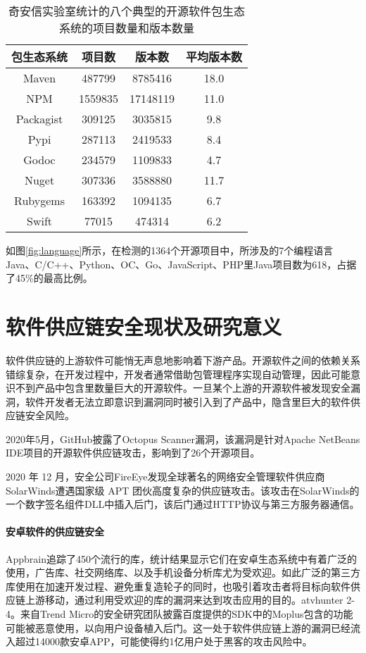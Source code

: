 \begin{table}[!hpt]
  \caption{奇安信实验室统计的八个典型的开源软件包生态系统的项目数量和版本数量}
  \label{tab:version}
  \centering
  \begin{tabular}{cccc} \toprule
    包生态系统 & 项目数 & 版本数 & 平均版本数 \\ \midrule
	Maven & 487799 & 8785416 & 18.0 \\
	NPM & 1559835 & 17148119 & 11.0 \\
	Packagist & 309125 & 3035815 & 9.8 \\
	Pypi & 287113 & 2419533 & 8.4 \\
	Godoc & 234579 & 1109833 & 4.7 \\
	Nuget & 307336 & 3588880 & 11.7 \\
	Rubygems & 163392 & 1094135 & 6.7 \\
	Swift & 77015 & 474314 & 6.2 \\ \bottomrule
  \end{tabular}
\end{table}

如图\ref{fig:language}所示，在检测的1364个开源项目中，所涉及的7个编程语言Java、C/C++、Python、OC、Go、JavaScript、PHP里Java项目数为618，占据了45\%的最高比例。




\section{软件供应链安全现状及研究意义}
软件供应链的上游软件可能悄无声息地影响着下游产品。开源软件之间的依赖关系错综复杂，在开发过程中，开发者通常借助包管理程序实现自动管理，因此可能意识不到产品中包含里数量巨大的开源软件。一旦某个上游的开源软件被发现安全漏洞，软件开发者无法立即意识到漏洞同时被引入到了产品中，隐含里巨大的软件供应链安全风险。

2020年5月，GitHub披露了Octopus Scanner漏洞\cite{octopus}，该漏洞是针对Apache NetBeans IDE项目的开源软件供应链攻击，影响到了26个开源项目。

2020 年 12 月，安全公司FireEye发现全球著名的网络安全管理软件供应商 SolarWinds遭遇国家级 APT 团伙高度复杂的供应链攻击。该攻击在SolarWinds的一个数字签名组件DLL中插入后门，该后门通过HTTP协议与第三方服务器通信。

\paragraph{安卓软件的供应链安全} Appbrain\cite{appbrain}追踪了450个流行的库，统计结果显示它们在安卓生态系统中有着广泛的使用，广告库、社交网络库、以及手机设备分析库尤为受欢迎。如此广泛的第三方库使用在加速开发过程、避免重复造轮子的同时，也吸引着攻击者将目标向软件供应链上游移动，通过利用受欢迎的库的漏洞来达到攻击应用的目的。atvhunter 2-4。来自Trend Micro的安全研究团队披露百度提供的SDK中的Moplus包含的功能可能被恶意使用，以向用户设备植入后门\cite{baidu}。这一处于软件供应链上游的漏洞已经流入超过14000款安卓APP，可能使得约1亿用户处于黑客的攻击风险中。

